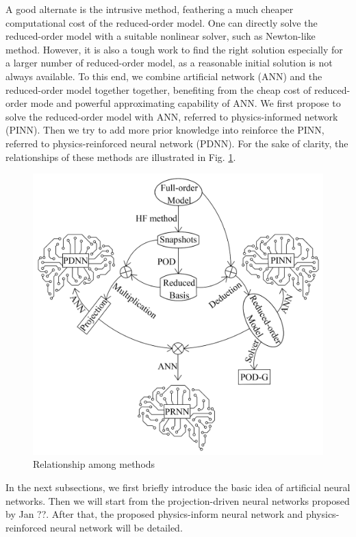 \documentclass[preprint, 10pt]{elsarticle}
\begin{document}
A good alternate is the intrusive method, feathering a much cheaper computational cost of the reduced-order model. One can directly solve the reduced-order model with a suitable nonlinear solver, such as Newton-like method. However, it is also a tough work to find the right solution especially for a larger number of reduced-order model, as a reasonable initial solution is not always available. To this end, we combine artificial network (ANN) and the reduced-order model together together, benefiting from the cheap cost of reduced-order mode and powerful approximating capability of ANN. We first propose to solve the reduced-order model with ANN, referred to physics-informed network (PINN). Then we try to add more prior knowledge into reinforce the PINN, referred to physics-reinforced neural network (PDNN). For the sake of clarity, the relationships of these methods are illustrated in Fig. \ref{fig_relationship}.
\begin{figure}[!ht]
  \centering
  \includegraphics[width=12cm]{../fig/RelationshipChart.pdf}
\caption{Relationship among methods}
\label{fig_relationship}
\end{figure}

In the next subsections, we first briefly introduce the basic idea of artificial neural networks. Then we will start from the projection-driven neural networks proposed by Jan ??. After that, the proposed physics-inform neural network and physics-reinforced neural network will be detailed.
\end{document}
